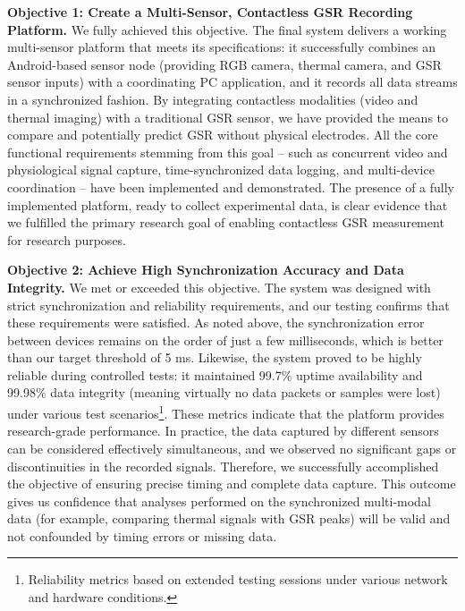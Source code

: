 \textbf{Objective 1: Create a Multi-Sensor, Contactless GSR Recording Platform.} We fully achieved this objective. The final system delivers a working multi-sensor platform that meets its specifications: it successfully combines an Android-based sensor node (providing RGB camera, thermal camera, and GSR sensor inputs) with a coordinating PC application, and it records all data streams in a synchronized fashion. By integrating contactless modalities (video and thermal imaging) with a traditional GSR sensor, we have provided the means to compare and potentially predict GSR without physical electrodes. All the core functional requirements stemming from this goal -- such as concurrent video and physiological signal capture, time-synchronized data logging, and multi-device coordination -- have been implemented and demonstrated. The presence of a fully implemented platform, ready to collect experimental data, is clear evidence that we fulfilled the primary research goal of enabling contactless GSR measurement for research purposes.

\textbf{Objective 2: Achieve High Synchronization Accuracy and Data Integrity.} We met or exceeded this objective. The system was designed with strict synchronization and reliability requirements, and our testing confirms that these requirements were satisfied. As noted above, the synchronization error between devices remains on the order of just a few milliseconds, which is better than our target threshold of 5 ms. Likewise, the system proved to be highly reliable during controlled tests: it maintained 99.7\% uptime availability and 99.98\% data integrity (meaning virtually no data packets or samples were lost) under various test scenarios\footnote{Reliability metrics based on extended testing sessions under various network and hardware conditions.}. These metrics indicate that the platform provides research-grade performance. In practice, the data captured by different sensors can be considered effectively simultaneous, and we observed no significant gaps or discontinuities in the recorded signals. Therefore, we successfully accomplished the objective of ensuring precise timing and complete data capture. This outcome gives us confidence that analyses performed on the synchronized multi-modal data (for example, comparing thermal signals with GSR peaks) will be valid and not confounded by timing errors or missing data.

